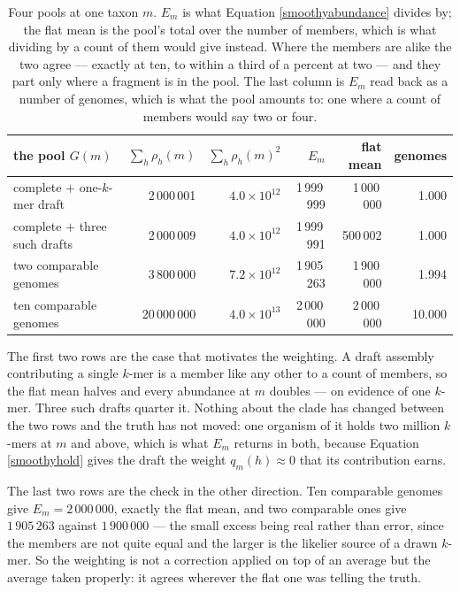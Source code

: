 \documentclass[pdflatex,sn-vancouver-num]{sn-jnl}
\begin{document}
\begin{appendices}
    \begin{table}[!htbp]
        \centering
        \footnotesize
        \setlength{\tabcolsep}{4pt}
        \begin{tabular}{@{}l|r|r|r|r|r@{}}
            \textbf{the pool $G(m)$} & $\sum_{h} \rho_h(m)$ & $\sum_{h} \rho_h(m)^{2}$ &
                $E_m$ & \textbf{flat mean} & \textbf{genomes}\\
            \hline
            complete $+$ one-$k$-mer draft & 2\,000\,001 & $4.0 \times 10^{12}$ &
                1\,999\,999 & 1\,000\,000 & 1.000\\
            complete $+$ three such drafts & 2\,000\,009 & $4.0 \times 10^{12}$ &
                1\,999\,991 & 500\,002 & 1.000\\
            two comparable genomes & 3\,800\,000 & $7.2 \times 10^{12}$ &
                1\,905\,263 & 1\,900\,000 & 1.994\\
            ten comparable genomes & 20\,000\,000 & $4.0 \times 10^{13}$ &
                2\,000\,000 & 2\,000\,000 & 10.000\\
        \end{tabular}
        \caption{Four pools at one taxon $m$. $E_m$ is what Equation \eqref{smoothyabundance}
        divides by; the flat mean is the pool's total over the number of members, which is what dividing by a
        count of them would give instead. Where the members are alike the two agree --- exactly at ten, to within a
        third of a percent at two --- and they part only where a fragment is in the pool. The last
        column is $E_m$ read back as a number of genomes, which is what the pool amounts to: one
        where a count of members would say two or four.}\label{efftable}
    \end{table}

    The first two rows are the case that motivates the weighting. A draft assembly contributing a
    single $k$-mer is a member like any other to a count of members, so the flat mean halves and
    every abundance at $m$ doubles --- on evidence of one $k$-mer. Three such drafts quarter it.
    Nothing about the clade has changed between the two rows and the truth has not moved: one
    organism of it holds two million $k$-mers at $m$ and above, which is what $E_m$ returns in both,
    because Equation \eqref{smoothyhold} gives the draft the weight $q_m(h) \approx 0$ that its
    contribution earns.

    The last two rows are the check in the other direction. Ten comparable genomes give
    $E_m = 2\,000\,000$, exactly the flat mean, and two comparable ones give $1\,905\,263$ against
    $1\,900\,000$ --- the small excess being real rather than error, since the members are not quite
    equal and the larger is the likelier source of a drawn $k$-mer. So the weighting is not a
    correction applied on top of an average but the average taken properly: it agrees wherever the
    flat one was telling the truth.


\end{appendices}
\end{document}
